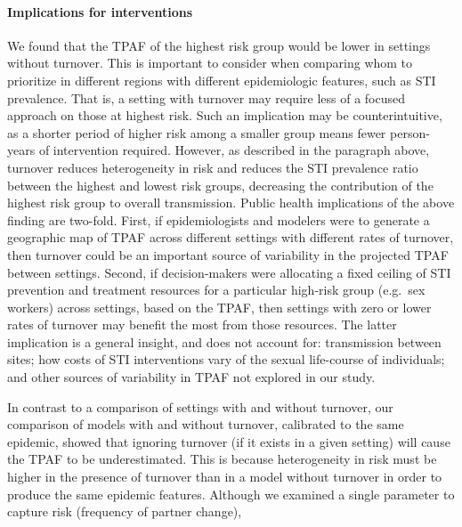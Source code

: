 \paragraph{Implications for interventions}
We found that the TPAF of the highest risk group
would be lower in settings without turnover.
This is important to consider when comparing whom to prioritize in different regions
with different epidemiologic features, such as STI prevalence.
That is, a setting with turnover may require less of a focused approach on those at highest risk.
Such an implication may be counterintuitive,
as a shorter period of higher risk among a smaller group means
fewer person-years of intervention required.
However, as described in the paragraph above,
turnover reduces heterogeneity in risk and
reduces the STI prevalence ratio between the highest and lowest risk groups,
decreasing the contribution of the highest risk group to overall transmission.
Public health implications of the above finding are two-fold.
First, if epidemiologists and modelers were to generate
a geographic map of TPAF across different settings with different rates of turnover,
then turnover could be an important source of variability in
the projected TPAF between settings.
Second, if decision-makers were allocating
a fixed ceiling of STI prevention and treatment resources
for a particular high-risk group (e.g.\ sex workers) across settings,
based on the TPAF, then settings with zero or lower rates of turnover
may benefit the most from those resources.
The latter implication is a general insight, and does not account for:
transmission between sites;
how costs of STI interventions vary of the sexual life-course of individuals;
and other sources of variability in TPAF not explored in our study.
\par
In contrast to a comparison of settings with and without turnover,
our comparison of models with and without turnover, calibrated to the same epidemic,
showed that ignoring turnover (if it exists in a given setting)
will cause the TPAF to be underestimated.
This is because heterogeneity in risk
must be higher in the presence of turnover than in a model without turnover
in order to produce the same epidemic features.
Although we examined a single parameter to capture risk (frequency of partner change),
